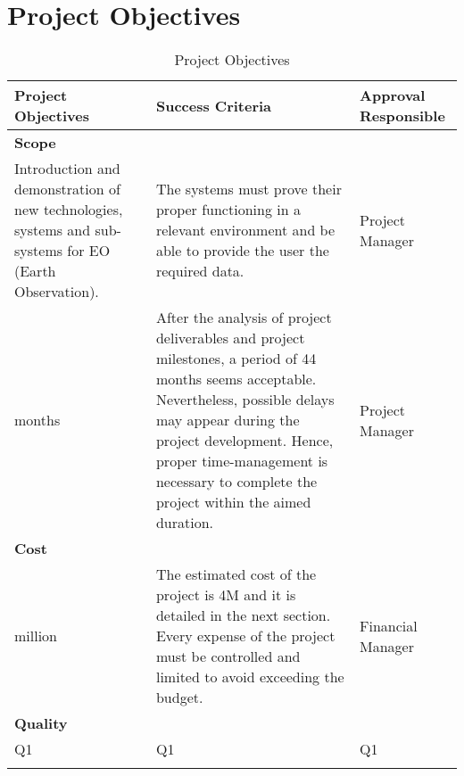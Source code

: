 \section{Project Objectives}
\begin{center}
	\begin{longtable}{>{\raggedright\arraybackslash}p{5cm} >{\raggedright\arraybackslash}p{5cm} >{\raggedleft\arraybackslash}p{2.5cm}}
		\toprule[2pt]
		\textbf{Project Objectives} & \textbf{Success Criteria} & \textbf{Approval Responsible} \\
		\midrule \endhead
		\textbf{Scope} &  &  \\
		\hline
		Introduction and demonstration of new technologies, systems and sub-systems for EO (Earth Observation). & The systems must prove their proper functioning in a relevant environment and be able to provide the user the required data. & Project Manager \\
		\hline
		44 months & After the analysis of project deliverables and project milestones, a period of 44 months seems acceptable. Nevertheless, possible delays may appear during the project development. Hence, proper time-management is necessary to complete the project within the aimed duration. & Project Manager  \\
		\hline
		\textbf{Cost} &  &   \\
		\hline
		4 million & The estimated cost of the project is 4M  and it is detailed in the next section. Every expense of the project must be controlled and limited to avoid exceeding the budget. & Financial Manager  \\	
		\hline
		\textbf{Quality} &  &   \\
		\hline
		Q1 & Q1 & Q1  \\	
		\bottomrule[2pt]
		\caption{Project Objectives}
	\end{longtable}
\end{center}